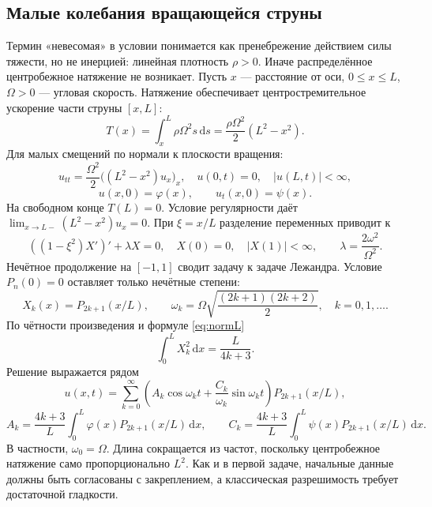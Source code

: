\documentclass[12pt,a4paper]{article}
\newcommand{\dd}{\,\mathrm{d}}
\begin{document}
\subsection{Малые колебания вращающейся струны}
Термин «невесомая» в условии понимается как пренебрежение действием силы тяжести, но не инерцией: линейная плотность $\rho>0$. Иначе распределённое центробежное натяжение не возникает. Пусть $x$ --- расстояние от оси, $0\le x\le L$, $\Omega>0$ --- угловая скорость. Натяжение обеспечивает центростремительное ускорение части струны $[x,L]$:
\[
T(x)=\int_x^L\rho\Omega^2s\dd s
=\frac{\rho\Omega^2}{2}(L^2-x^2).
\]
Для малых смещений по нормали к плоскости вращения:
\begin{equation}\label{eq:string2}
u_{tt}=\frac{\Omega^2}{2}\bigl((L^2-x^2)u_x\bigr)_x,
\quad u(0,t)=0,\quad |u(L,t)|<\infty,
\end{equation}
\[
u(x,0)=\varphi(x),\qquad u_t(x,0)=\psi(x).
\]
На свободном конце $T(L)=0$. Условие регулярности даёт $\lim_{x\to L-}(L^2-x^2)u_x=0$. При $\xi=x/L$ разделение переменных приводит к
\[
((1-\xi^2)X')'+\lambda X=0,\quad X(0)=0,\quad |X(1)|<\infty,
\qquad \lambda=\frac{2\omega^2}{\Omega^2}.
\]
Нечётное продолжение на $[-1,1]$ сводит задачу к задаче Лежандра. Условие $P_n(0)=0$ оставляет только нечётные степени:
\[
X_k(x)=P_{2k+1}(x/L),\qquad
\omega_k=\Omega\sqrt{\frac{(2k+1)(2k+2)}2},\quad k=0,1,\ldots.
\]
По чётности произведения и формуле \eqref{eq:normL}
\[
\int_0^L X_k^2\dd x=\frac{L}{4k+3}.
\]
Решение выражается рядом
\begin{equation}\label{eq:sol2}
u(x,t)=\sum_{k=0}^{\infty}
\left(A_k\cos\omega_kt+\frac{C_k}{\omega_k}\sin\omega_kt\right)
P_{2k+1}(x/L),
\end{equation}
\[
A_k=\frac{4k+3}{L}\int_0^L\varphi(x)P_{2k+1}(x/L)\dd x,\qquad
C_k=\frac{4k+3}{L}\int_0^L\psi(x)P_{2k+1}(x/L)\dd x.
\]
В частности, $\omega_0=\Omega$. Длина сокращается из частот, поскольку центробежное натяжение само пропорционально $L^2$. Как и в первой задаче, начальные данные должны быть согласованы с закреплением, а классическая разрешимость требует достаточной гладкости.
\end{document}
